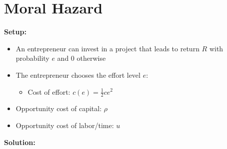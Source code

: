 \documentclass[a4paper]{article}
\begin{document}
\section{Moral Hazard}
\textbf{Setup:}
\begin{itemize}
    \item An entrepreneur can invest in a project that leads to return $R$ with probability $e$ and 0 otherwise
    \item The entrepreneur chooses the effort level $e$:
    \begin{itemize}
        \item Cost of effort: $c(e)=\frac{1}{2}ce^2$
    \end{itemize}
    \item Opportunity cost of capital: $\rho$
    \item Opportunity cost of labor/time: $u$
\end{itemize}
\textbf{Solution:}
\end{document}
